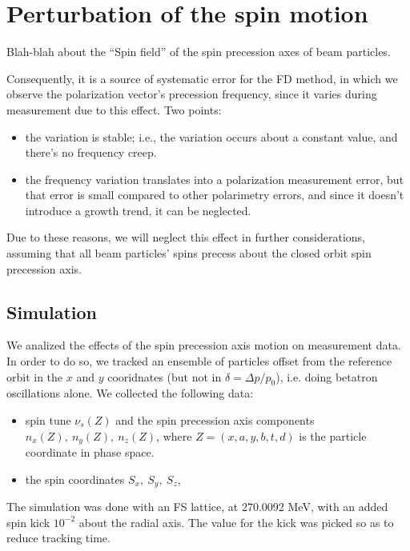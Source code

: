 \documentclass{article}
\begin{document}
\tableofcontents
\newpage

\section{Perturbation of the spin motion}
Blah-blah about the ``Spin field'' of the spin precession axes of beam particles.

Consequently, it is a source of systematic error for the FD method, in which we observe the polarization vector's precession frequency, since it varies during measurement due to this effect. Two points:
\begin{itemize}
\item the variation is stable; i.e., the variation occurs about a constant value, and there's no frequency creep.
\item the frequency variation translates into a polarization measurement error, but that error is small compared to other polarimetry errors, and since it doesn't introduce a growth trend, it can be neglected.
\end{itemize}

Due to these reasons, we will neglect this effect in further considerations, assuming that all beam particles' spins precess about the closed orbit spin precession axis.

\subsection{Simulation}
We analized the effects of the spin precession axis motion on measurement data. In order to do so, we tracked an ensemble of particles offset from the reference orbit in the $x$ and $y$ cooridnates (but not in $\delta = \Delta p/p_0$), i.e. doing betatron oscillations alone. We collected the following data:
\begin{itemize}
  \item spin tune $\nu_s(Z)$ and the spin precession axis components $n_x(Z),~n_y(Z),~ n_z(Z)$, where $Z = (x,a,y,b,t,d)$ is the particle coordinate in phase space.~\citep[p.~9]{Eremey:Thesis}
\item the spin coordinates $S_x,~S_y,~S_z$,
\end{itemize}
The simulation was done with an FS lattice, at 270.0092 MeV, with an added spin kick $10^{-2}$ about the radial axis. The value for the kick was picked so as to reduce tracking time.
\end{document}
